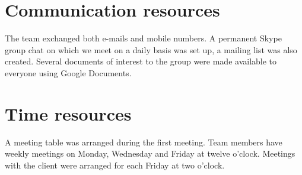 
\section{Communication resources}

The team exchanged both e-mails and mobile numbers. A permanent Skype
group chat on which we meet on a daily basis was set up, a mailing
list was also created. Several documents of interest to the group
were made available to everyone using Google Documents.


\section{Time resources}

A meeting table was arranged during the first meeting. Team members
have weekly meetings on Monday, Wednesday and Friday at twelve o'clock.
Meetings with the client were arranged for each Friday at two o'clock. 
